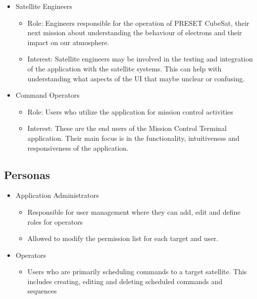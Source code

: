 \documentclass[12pt]{article}
\begin{document}
\begin{itemize}
    \item Satellite Engineers
    \begin{itemize}
        \item Role: Engineers responsible for the operation of PRESET CubeSat, their next mission about understanding the behaviour of electrons and their impact on our atmosphere. 

        \item Interest: Satellite engineers may be involved in the testing and integration of the application with the satellite systems. This can help with understanding what aspects of the UI that maybe unclear or confusing.  

    \end{itemize}
    \item Command Operators
    \begin{itemize}
        \item Role: Users who utilize the application for mission control activities
        \item Interest: These are the end users of the Mission Control Terminal application. Their main focus is in the functionality, intuitiveness and responsiveness of the application.

    \end{itemize}
\end{itemize}

\subsection{Personas}
\begin{itemize}
    \item Application Administrators
    \begin{itemize}
        \item Responsible for user management where they can add, edit and define roles for operators
        \item Allowed to modify the permission list for each target and user.
    \end{itemize}

    \item Operators
    \begin{itemize}
        \item Users who are primarily scheduling commands to a target satellite. This includes creating, editing and deleting scheduled commands and sequences
    \end{itemize}
\end{itemize}
\end{document}
